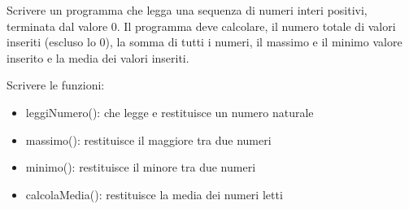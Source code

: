 \begin{Exercise}[label={ex:operazioni}]
    Scrivere un programma che legga una sequenza di numeri interi positivi, terminata dal valore 0.
    Il programma deve calcolare, il numero totale di valori inseriti (escluso lo 0), la somma di tutti i numeri,
    il massimo e il minimo valore inserito e la media dei valori inseriti.

    Scrivere le funzioni:
    \begin{itemize}
        \item leggiNumero(): che legge e restituisce un numero naturale
        \item massimo(): restituisce il maggiore tra due numeri
        \item minimo(): restituisce il minore tra due numeri
        \item calcolaMedia(): restituisce la media dei numeri letti
    \end{itemize}
\end{Exercise}

\begin{Answer}[ref={ex:operazioni}]
  	
\end{Answer}